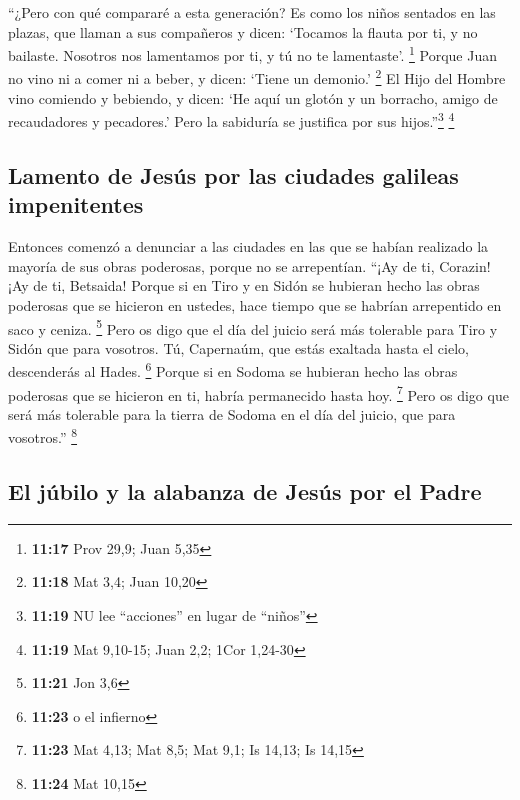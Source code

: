  ``¿Pero con qué compararé a esta generación? Es como los
niños sentados en las plazas, que llaman a sus compañeros
 y dicen: `Tocamos la flauta por ti, y no bailaste.
Nosotros nos lamentamos por ti, y tú no te lamentaste'. \footnote{\textbf{11:17}
  Prov 29,9; Juan 5,35}  Porque Juan no vino ni a comer
ni a beber, y dicen: `Tiene un demonio.' \footnote{\textbf{11:18} Mat
  3,4; Juan 10,20}  El Hijo del Hombre vino comiendo y
bebiendo, y dicen: `He aquí un glotón y un borracho, amigo de
recaudadores y pecadores.' Pero la sabiduría se justifica por sus
hijos.''\footnote{\textbf{11:19} NU lee ``acciones'' en lugar de
  ``niños''} \footnote{\textbf{11:19} Mat 9,10-15; Juan 2,2; 1Cor
  1,24-30}

\hypertarget{lamento-de-jesuxfas-por-las-ciudades-galileas-impenitentes}{%
\subsection{Lamento de Jesús por las ciudades galileas
impenitentes}\label{lamento-de-jesuxfas-por-las-ciudades-galileas-impenitentes}}

 Entonces comenzó a denunciar a las ciudades en las que
se habían realizado la mayoría de sus obras poderosas, porque no se
arrepentían.  ``¡Ay de ti, Corazin! ¡Ay de ti, Betsaida!
Porque si en Tiro y en Sidón se hubieran hecho las obras poderosas que
se hicieron en ustedes, hace tiempo que se habrían arrepentido en saco y
ceniza. \footnote{\textbf{11:21} Jon 3,6}  Pero os digo
que el día del juicio será más tolerable para Tiro y Sidón que para
vosotros.  Tú, Capernaúm, que estás exaltada hasta el
cielo, descenderás al Hades. \footnote{\textbf{11:23} o el infierno}
Porque si en Sodoma se hubieran hecho las obras poderosas que se
hicieron en ti, habría permanecido hasta hoy. \footnote{\textbf{11:23}
  Mat 4,13; Mat 8,5; Mat 9,1; Is 14,13; Is 14,15}  Pero
os digo que será más tolerable para la tierra de Sodoma en el día del
juicio, que para vosotros.'' \footnote{\textbf{11:24} Mat 10,15}

\hypertarget{el-juxfabilo-y-la-alabanza-de-jesuxfas-por-el-padre}{%
\subsection{El júbilo y la alabanza de Jesús por el
Padre}\label{el-juxfabilo-y-la-alabanza-de-jesuxfas-por-el-padre}}

